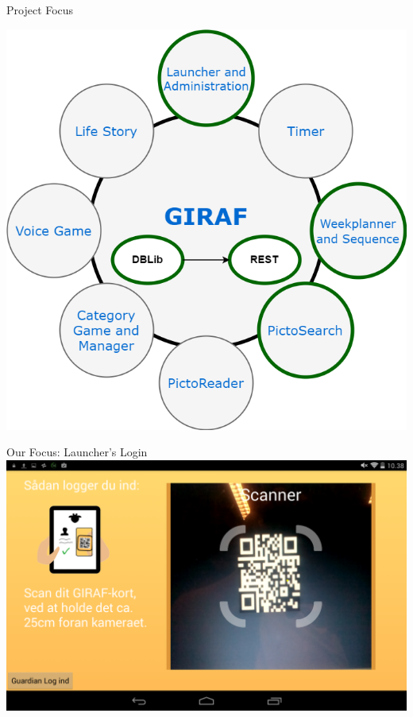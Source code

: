\begin{frame}{Project Focus}
\begin{center}
\begin{minipage}[H]{0.9\linewidth}
\includegraphics[scale=0.31]{figures/GirafFocus.png} 
\end{minipage}
\end{center}
\end{frame}

\begin{frame}{Our Focus: Launcher's Login}
\includegraphics[scale=0.21]{figures/Login.png}
\end{frame}

